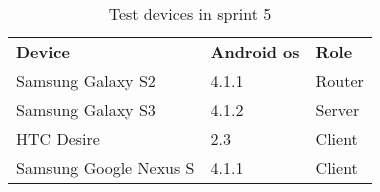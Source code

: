 \begin{table}[!ht]\centering
\caption{Test devices in sprint 5}
\label{tab:sp5_test}
\def\arraystretch{1.3}
\begin{tabular}{lll}
\toprule[0.5mm]
\textbf{Device} & \textbf{Android os} & \textbf{Role}\\

Samsung Galaxy S2 &  4.1.1 & Router  \\
Samsung Galaxy S3 &  4.1.2 & Server \\
HTC Desire & 2.3 & Client  \\
Samsung Google Nexus S & 4.1.1 & Client \\
\bottomrule[0.5mm]
\end{tabular}
\end{table}